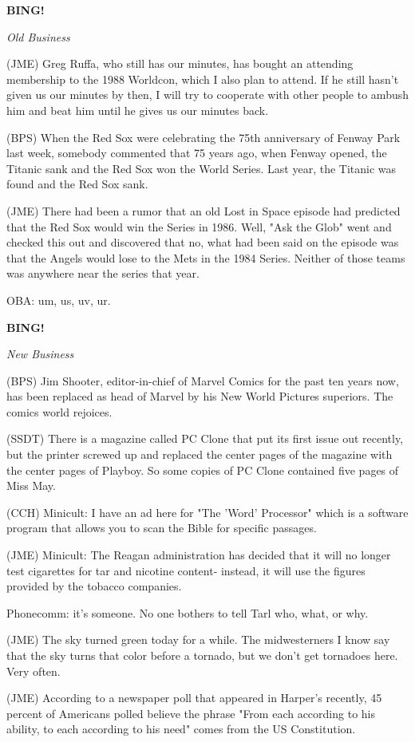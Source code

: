 \documentclass[12pt]{article}
\newcommand{\bing}{{\bf BING!} }
\newcommand{\goto}[1]{\bing \vskip 12pt \centerline{{\em{#1}}}}
\begin{document}
\goto{Old Business}

(JME) Greg Ruffa, who still has our minutes, has bought an attending membership to the 1988 Worldcon, which I also plan to attend. If he still hasn't given us our minutes by then, I will try to cooperate with other people to ambush him and beat him until he gives us our minutes back.

(BPS) When the Red Sox were celebrating the 75th anniversary of Fenway Park last week, somebody commented that 75 years ago, when Fenway opened, the Titanic sank and the Red Sox won the World Series. Last year, the Titanic was found and the Red Sox sank.

(JME) There had been a rumor that an old Lost in Space episode had predicted that the Red Sox would win the Series in 1986. Well, "Ask the Glob" went and checked this out and discovered that no, what had been said on the episode was that the Angels would lose to the Mets in the 1984 Series. Neither of those teams was anywhere near the series that year.

OBA: um, us, uv, ur.

\goto{New Business}

(BPS) Jim Shooter, editor-in-chief of Marvel Comics for the past ten years now, has been replaced as head of Marvel by his New World Pictures superiors. The comics world rejoices.

(SSDT) There is a magazine called PC Clone that put its first issue out recently, but the printer screwed up and replaced the center pages of the magazine with the center pages of Playboy. So some copies of PC Clone contained five pages of Miss May.

(CCH) Minicult: I have an ad here for "The 'Word' Processor" which is a software program that allows you to scan the Bible for specific passages.

(JME) Minicult: The Reagan administration has decided that it will no longer test cigarettes for tar and nicotine content- instead, it will use the figures provided by the tobacco companies.

Phonecomm: it's someone. No one bothers to tell Tarl who, what, or why.

(JME) The sky turned green today for a while. The midwesterners I know say that the sky turns that color before a tornado, but we don't get tornadoes here. Very often.

(JME) According to a newspaper poll that appeared in Harper's recently, 45 percent of Americans polled believe the phrase "From each according to his ability, to each according to his need" comes from the US Constitution.
\end{document}
